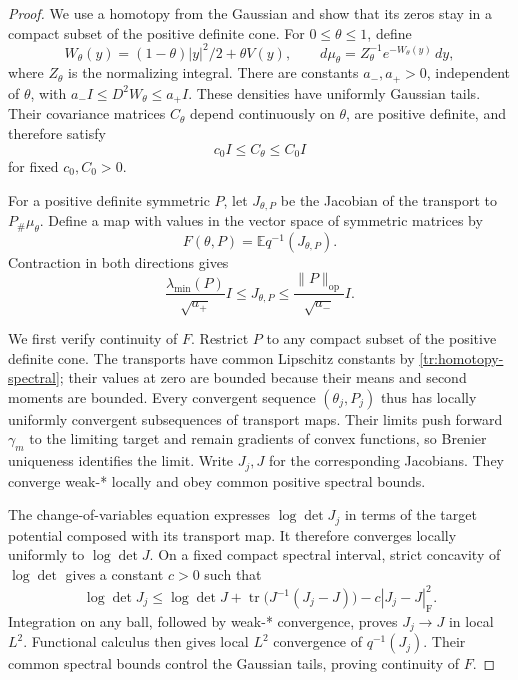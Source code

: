\documentclass[11pt]{article}
\theoremstyle{definition}
\theoremstyle{remark}
\numberwithin{equation}{section}
\begin{document}
\begin{proof}
We use a homotopy from the Gaussian and show that its zeros stay in a
compact subset of the positive definite cone.  For $0\le\theta\le1$,
define
\[
 W_\theta(y)=(1-\theta)|y|^2/2+\theta V(y),\qquad
 d\mu_\theta=Z_\theta^{-1}e^{-W_\theta(y)}\,dy,
\]
where $Z_\theta$ is the normalizing integral.
There are constants $a_-,a_+>0$, independent of $\theta$, with
$a_-I\le D^2W_\theta\le a_+I$.  These densities have uniformly
Gaussian tails.  Their covariance matrices $C_\theta$ depend
continuously on $\theta$, are positive definite, and therefore satisfy
\begin{equation}\label{tr:homotopy-covariance}
 c_0I\le C_\theta\le C_0I
\end{equation}
for fixed $c_0,C_0>0$.

For a positive definite symmetric $P$, let $J_{\theta,P}$ be the
Jacobian of the transport to $P_\#\mu_\theta$.  Define a map with
values in the vector space of symmetric matrices by
\[
 F(\theta,P)=\mathbb E q^{-1}(J_{\theta,P}).
\]
Contraction in both directions gives
\begin{equation}\label{tr:homotopy-spectral}
 \frac{\lambda_{\min}(P)}{\sqrt{a_+}}I
 \le J_{\theta,P}\le\frac{\|P\|_{\mathrm{op}}}{\sqrt{a_-}}I.
\end{equation}

We first verify continuity of $F$.  Restrict $P$ to any compact subset
of the positive definite cone.  The transports have common Lipschitz
constants by \eqref{tr:homotopy-spectral}; their values at zero are
bounded because their means and second moments are bounded.  Every
convergent sequence $(\theta_j,P_j)$ thus has locally uniformly
convergent subsequences of transport maps.  Their limits push forward
$\gamma_m$ to the limiting target and remain gradients of convex
functions, so Brenier uniqueness identifies the limit.  Write $J_j,J$
for the corresponding Jacobians.  They converge weak-* locally and
obey common positive spectral bounds.

The change-of-variables equation expresses $\log\det J_j$ in terms
of the target potential composed with its transport map.  It therefore
converges locally uniformly to $\log\det J$.  On a fixed compact
spectral interval, strict concavity of $\log\det$ gives a constant
$c>0$ such that
\[
 \log\det J_j\le\log\det J+
 \operatorname{tr}\bigl(J^{-1}(J_j-J)\bigr)-c|J_j-J|_{\mathrm F}^2.
\]
Integration on any ball, followed by weak-* convergence, proves
$J_j\to J$ in local $L^2$.  Functional calculus then gives local
$L^2$ convergence of $q^{-1}(J_j)$.  Their common spectral bounds
control the Gaussian tails, proving continuity of $F$.


\end{proof}
\end{document}
